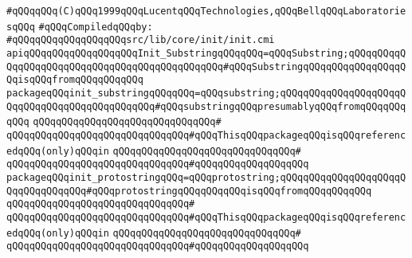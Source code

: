 \label{src/lib/core/init/init-utils.pkg}
\verb|#qQQqqQQq(C)qQQq1999qQQqLucentqQQqTechnologies,qQQqBellqQQqLaboratoriesqQQq|\newline
\newline
\verb|#qQQqCompiledqQQqby:|\newline
\verb|#qQQqqQQqqQQqqQQqqQQqsrc/lib/core/init/init.cmi|\newline
\newline
\verb|apiqQQqqQQqqQQqqQQqqQQqInit_SubstringqQQqqQQq=qQQqSubstring;qQQqqQQqqQQqqQQqqQQqqQQqqQQqqQQqqQQqqQQqqQQqqQQq#qQQqSubstringqQQqqQQqqQQqqQQqqQQqisqQQqfromqQQqqQQqqQQq|\newline
\newline
\verb|packageqQQqinit_substringqQQqqQQq=qQQqsubstring;qQQqqQQqqQQqqQQqqQQqqQQqqQQqqQQqqQQqqQQqqQQqqQQq#qQQqsubstringqQQqpresumablyqQQqfromqQQqqQQqqQQq|\newline
\verb|qQQqqQQqqQQqqQQqqQQqqQQqqQQqqQQq#|\newline
\verb|qQQqqQQqqQQqqQQqqQQqqQQqqQQqqQQq#qQQqThisqQQqpackageqQQqisqQQqreferencedqQQq(only)qQQqin|\newline
\verb|qQQqqQQqqQQqqQQqqQQqqQQqqQQqqQQq#|\newline
\verb|qQQqqQQqqQQqqQQqqQQqqQQqqQQqqQQq#qQQqqQQqqQQqqQQqqQQq|\newline
\newline
\verb|packageqQQqinit_protostringqQQq=qQQqprotostring;qQQqqQQqqQQqqQQqqQQqqQQqqQQqqQQqqQQq#qQQqprotostringqQQqqQQqqQQqisqQQqfromqQQqqQQqqQQq|\newline
\verb|qQQqqQQqqQQqqQQqqQQqqQQqqQQqqQQq#|\newline
\verb|qQQqqQQqqQQqqQQqqQQqqQQqqQQqqQQq#qQQqThisqQQqpackageqQQqisqQQqreferencedqQQq(only)qQQqin|\newline
\verb|qQQqqQQqqQQqqQQqqQQqqQQqqQQqqQQq#|\newline
\verb|qQQqqQQqqQQqqQQqqQQqqQQqqQQqqQQq#qQQqqQQqqQQqqQQqqQQq|\newline

